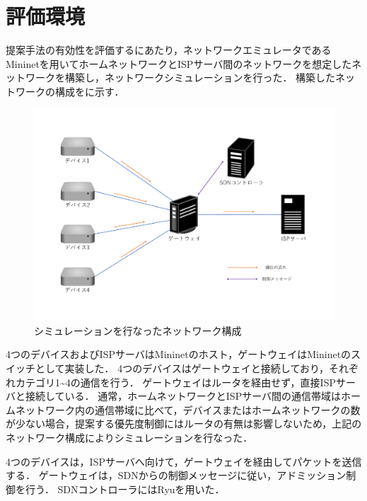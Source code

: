 \documentclass[a4paper,11pt,uplatex]{ujreport}
\begin{document}
\section{評価環境}
\label{評価環境}

提案手法の有効性を評価するにあたり，ネットワークエミュレータであるMininet\cite{Mininet}を用いてホームネットワークとISPサーバ間のネットワークを想定したネットワークを構築し，ネットワークシミュレーションを行った．
構築したネットワークの構成をに示す．\par

\begin{figure}[!b]
  \centering
  \includegraphics[width=\linewidth]{img/experiment.pdf}
  \caption{シミュレーションを行なったネットワーク構成}
  \label{fig:experiment}
\end{figure}

4つのデバイスおよびISPサーバはMininetのホスト，ゲートウェイはMininetのスイッチとして実装した．
4つのデバイスはゲートウェイと接続しており，それぞれカテゴリ1\textasciitilde4の通信を行う．
ゲートウェイはルータを経由せず，直接ISPサーバと接続している．
通常，ホームネットワークとISPサーバ間の通信帯域はホームネットワーク内の通信帯域に比べて，デバイスまたはホームネットワークの数が少ない場合，提案する優先度制御にはルータの有無は影響しないため，上記のネットワーク構成によりシミュレーションを行なった．\par
4つのデバイスは，ISPサーバへ向けて，ゲートウェイを経由してパケットを送信する．
ゲートウェイは，SDNからの制御メッセージに従い，アドミッション制御を行う．
SDNコントローラにはRyu\cite{Ryu}を用いた．\par
\end{document}
